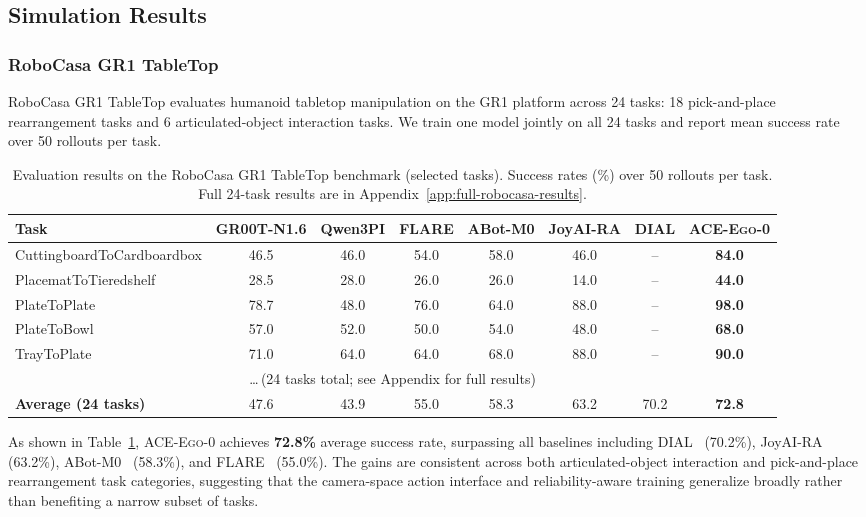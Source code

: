 \documentclass{article}
\newcommand{\OURS}{\textsc{ACE-Ego-0}\xspace}
\newcommand{\Ours}{\OURS}
\begin{document}
\subsection{Simulation Results}
\label{sec:sim_results}

\subsubsection{RoboCasa GR1 TableTop}
\label{sec:robocasa}

RoboCasa GR1 TableTop evaluates humanoid tabletop manipulation on the GR1 platform across 24 tasks: 18 pick-and-place rearrangement tasks and 6 articulated-object interaction tasks. 
We train one model jointly on all 24 tasks and report mean success rate over 50 rollouts per task.

\begin{table}[t]
\centering
\caption{Evaluation results on the RoboCasa GR1 TableTop benchmark (selected tasks). Success rates (\%) over 50 rollouts per task. Full 24-task results are in Appendix~\ref{app:full-robocasa-results}.}
\label{tab:robocasa_gr1_results}
\vspace{0.3em}
\small
\renewcommand{\arraystretch}{1.1}
\setlength{\tabcolsep}{4pt}
\begin{tabular*}{\textwidth}{@{\extracolsep{\fill}}lccccccc}
\hline
\textbf{Task} & GR00T-N1.6 & Qwen3PI & FLARE & ABot-M0 & JoyAI-RA & DIAL & \Ours \\
\hline
CuttingboardToCardboardbox & 46.5 & 46.0 & 54.0 & 58.0 & 46.0 & -- & \textbf{84.0} \\
PlacematToTieredshelf      & 28.5 & 28.0 & 26.0 & 26.0 & 14.0 & -- & \textbf{44.0} \\
PlateToPlate               & 78.7 & 48.0 & 76.0 & 64.0 & 88.0 & -- & \textbf{98.0} \\
PlateToBowl                & 57.0 & 52.0 & 50.0 & 54.0 & 48.0 & -- & \textbf{68.0} \\
TrayToPlate                & 71.0 & 64.0 & 64.0 & 68.0 & 88.0 & -- & \textbf{90.0} \\
\multicolumn{8}{c}{\ldots\,(24 tasks total; see Appendix for full results)} \\
\hline
\textbf{Average (24 tasks)} & 47.6 & 43.9 & 55.0 & 58.3 & 63.2 & 70.2 & \textbf{72.8} \\
\hline
\end{tabular*}
\end{table}

As shown in Table~\ref{tab:robocasa_gr1_results}, \Ours achieves \textbf{72.8\%} average success rate, surpassing all baselines including DIAL~\cite{chen2026dial} (70.2\%), JoyAI-RA~\cite{zhang2026joyaira} (63.2\%), ABot-M0~\cite{yang2026abot} (58.3\%), and FLARE~\cite{pmlr-v305-zheng25a} (55.0\%). The gains are consistent across both articulated-object interaction and pick-and-place rearrangement task categories, suggesting that the camera-space action interface and reliability-aware training generalize broadly rather than benefiting a narrow subset of tasks.
\end{document}
